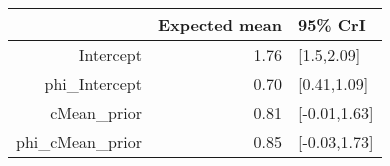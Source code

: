 \begin{tabular}{rrl}
  \hline
 & Expected mean & 95\% CrI \\ 
  \hline
Intercept & 1.76 & [1.5,2.09] \\ 
  phi\_Intercept & 0.70 & [0.41,1.09] \\ 
  cMean\_prior & 0.81 & [-0.01,1.63] \\ 
  phi\_cMean\_prior & 0.85 & [-0.03,1.73] \\ 
   \hline
\end{tabular}

